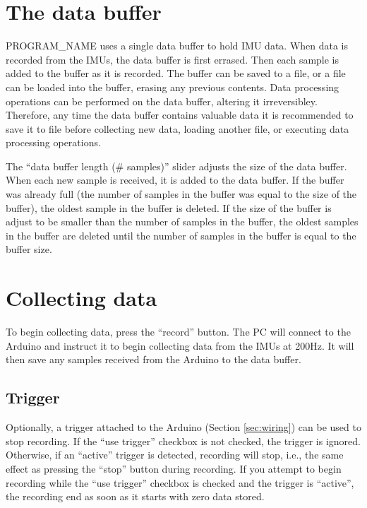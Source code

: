 \documentclass[11pt,letterpaper,article,oneside]{memoir}
\newcommand{\name}{PROGRAM\_NAME}
\begin{document}
\section{The data buffer}
\name{} uses a single data buffer to hold IMU data. When data is recorded from
the IMUs, the data buffer is first errased. Then each sample is added to the
buffer as it is recorded. The buffer can be saved to a file, or a file can be
loaded into the buffer, erasing any previous contents. Data processing
operations can be performed on the data buffer, altering it irreversibley.
Therefore, any time the data buffer contains valuable data it is recommended to
save it to file before collecting new data, loading another file, or executing
data processing operations.

The ``data buffer length (\# samples)'' slider adjusts the size of the data
buffer. When each new sample is received, it is added to the data buffer. If the
buffer was already full (the number of samples in the buffer was equal to the
size of the buffer), the oldest sample in the buffer is deleted. If the size of
the buffer is adjust to be smaller than the number of samples in the buffer, the
oldest samples in the buffer are deleted until the number of samples in the
buffer is equal to the buffer size.


\section{Collecting data}

To begin collecting data, press the ``record'' button.
The PC will connect to the Arduino and instruct it to begin collecting data from
the IMUs at 200Hz. It will then save any samples received from the Arduino to
the data buffer.



\subsection{Trigger}

Optionally, a trigger attached to the Arduino (Section \ref{sec:wiring}) can be
used to stop recording.  If the ``use trigger'' checkbox is not checked, the
trigger is ignored. Otherwise, if an ``active'' trigger is detected, recording
will stop, i.e., the same effect as pressing the ``stop'' button during
recording. If you attempt to begin recording while the ``use trigger'' checkbox
is checked and the trigger is ``active'', the recording end as soon as it starts
with zero data stored.
\end{document}
